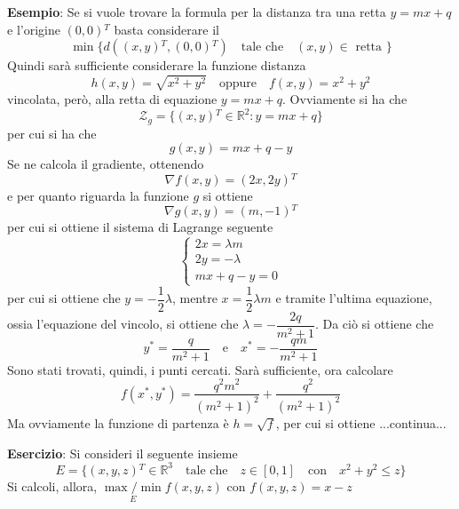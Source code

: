 \documentclass[a4paper]{extarticle}
\begin{document}
\vspace{2em}
\noindent
\textbf{Esempio}: Se si vuole trovare la formula per la distanza tra una retta $y=mx+q$ e l'origine $(0,0){^T}$ basta considerare il
\[\min \{d((x,y){^T},(0,0){^T}) \hspace{1em} \text{tale che} \hspace{1em} (x,y) \in \text{ retta }\}\]
Quindi sarà sufficiente considerare la funzione distanza
\[h(x,y)=\sqrt{x^2+y^2} \hspace{1em} \text{oppure} \hspace{1em} f(x,y) = x^2+y^2\]
vincolata, però, alla retta di equazione $y=mx+q$. Ovviamente si ha che
\[\mathcal{Z}_g = \{(x,y){^T} \in \mathbb{R}^2 : y=mx+q\}\]
per cui si ha che
\[g(x,y) = mx+q-y\]
Se ne calcola il gradiente, ottenendo
\[\nabla f(x,y) = (2x,2y){^T}\]
e per quanto riguarda la funzione $g$ si ottiene
\[\nabla g(x,y) = (m,-1){^T}\]
per cui si ottiene il sistema di Lagrange seguente
\[
   \left\{
        \begin{array}{l}
            2x = \lambda m\\
            2y = -\lambda\\
            mx+q-y=0
        \end{array}
   \right.
\]
per cui si ottiene che $y=-\dfrac{1}{2}\lambda$, mentre $x=\dfrac{1}{2}\lambda m$ e tramite l'ultima equazione, ossia l'equazione del vincolo, si ottiene che $\lambda=-\dfrac{2q}{m^2+1}$. Da ciò si ottiene che
\[y^*=\dfrac{q}{m^2+1} \hspace{1em} \text{e} \hspace{1em} x^*=-\dfrac{qm}{m^2+1}\]
Sono stati trovati, quindi, i punti cercati. Sarà sufficiente, ora calcolare
\[f(x^*,y^*) = \dfrac{q^2m^2}{(m^2+1)^2} + \dfrac{q^2}{(m^2+1)^2}\]
Ma ovviamente la funzione di partenza è $h = \sqrt{f}$, per cui si ottiene ...continua...

\vspace{2em}
\noindent
\textbf{Esercizio}: Si consideri il seguente insieme
\[E = \{(x,y,z){^T} \in \mathbb{R}^3 \hspace{1em} \text{tale che} \hspace{1em} z \in [0,1] \hspace{1em} \text{con} \hspace{1em} x^2 + y^2 \leq z\}\]
Si calcoli, allora, $\underset{E}{{\max}/{\min}} f(x,y,z)$ con $f(x,y,z) = x-z$
\end{document}

